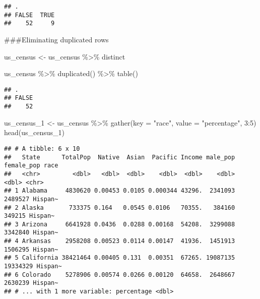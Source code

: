 \documentclass[
]{article}
\newenvironment{Shaded}{\begin{snugshade}}{\end{snugshade}}
\newcommand{\AttributeTok}[1]{\textcolor[rgb]{0.77,0.63,0.00}{#1}}
\newcommand{\DecValTok}[1]{\textcolor[rgb]{0.00,0.00,0.81}{#1}}
\newcommand{\FunctionTok}[1]{\textcolor[rgb]{0.00,0.00,0.00}{#1}}
\newcommand{\NormalTok}[1]{#1}
\newcommand{\OtherTok}[1]{\textcolor[rgb]{0.56,0.35,0.01}{#1}}
\newcommand{\SpecialCharTok}[1]{\textcolor[rgb]{0.00,0.00,0.00}{#1}}
\newcommand{\StringTok}[1]{\textcolor[rgb]{0.31,0.60,0.02}{#1}}
\begin{document}
\begin{verbatim}
## .
## FALSE  TRUE 
##    52     9
\end{verbatim}

\#\#\#Eliminating duplicated rows

\begin{Shaded}
\begin{Highlighting}[]
\NormalTok{us\_census }\OtherTok{\textless{}{-}}\NormalTok{ us\_census }\SpecialCharTok{\%\textgreater{}\%} 
\NormalTok{  distinct}

\NormalTok{us\_census }\SpecialCharTok{\%\textgreater{}\%} \FunctionTok{duplicated}\NormalTok{() }\SpecialCharTok{\%\textgreater{}\%} \FunctionTok{table}\NormalTok{()}
\end{Highlighting}
\end{Shaded}

\begin{verbatim}
## .
## FALSE 
##    52
\end{verbatim}

\begin{Shaded}
\begin{Highlighting}[]
\NormalTok{us\_census\_1 }\OtherTok{\textless{}{-}}\NormalTok{ us\_census }\SpecialCharTok{\%\textgreater{}\%}
  \FunctionTok{gather}\NormalTok{(}\AttributeTok{key =} \StringTok{"race"}\NormalTok{, }\AttributeTok{value =} \StringTok{"percentage"}\NormalTok{, }\DecValTok{3}\SpecialCharTok{:}\DecValTok{5}\NormalTok{)}
\FunctionTok{head}\NormalTok{(us\_census\_1)}
\end{Highlighting}
\end{Shaded}

\begin{verbatim}
## # A tibble: 6 x 10
##   State      TotalPop  Native  Asian  Pacific Income male_pop female_pop race   
##   <chr>         <dbl>   <dbl>  <dbl>    <dbl>  <dbl>    <dbl>      <dbl> <chr>  
## 1 Alabama     4830620 0.00453 0.0105 0.000344 43296.  2341093    2489527 Hispan~
## 2 Alaska       733375 0.164   0.0545 0.0106   70355.   384160     349215 Hispan~
## 3 Arizona     6641928 0.0436  0.0288 0.00168  54208.  3299088    3342840 Hispan~
## 4 Arkansas    2958208 0.00523 0.0114 0.00147  41936.  1451913    1506295 Hispan~
## 5 California 38421464 0.00405 0.131  0.00351  67265. 19087135   19334329 Hispan~
## 6 Colorado    5278906 0.00574 0.0266 0.00120  64658.  2648667    2630239 Hispan~
## # ... with 1 more variable: percentage <dbl>
\end{verbatim}
\end{document}
